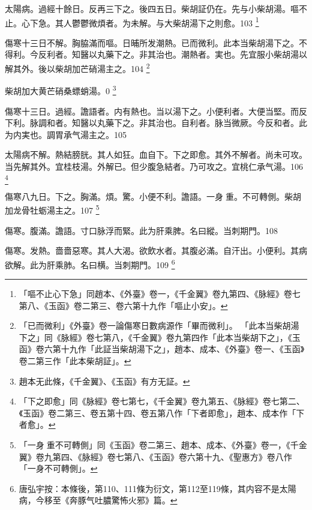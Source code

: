 太陽病。過經十餘日。反再三下之。後四五日。柴胡証仍在。先与小柴胡湯。嘔不止。心下急。其人鬱鬱微煩者。为未解。与大柴胡湯下之則愈。103
	\footnote{
		「嘔不止心下急」同趙本、《外臺》卷一，《千金翼》卷九第四、《脉經》卷七第八、《玉函》卷二第三、卷六第十九作「嘔止小安」。
	}

傷寒十三日不解。胸脇滿而嘔。日晡所发潮熱{\khaaitp 。已}而微利。此本当柴胡湯下之。不得利。今反利者。知醫以丸藥下之。非其治也。潮熱者。実也。先宜服小柴胡湯以解其外。後以柴胡加芒硝湯主之。104
	\footnote{
	「已而微利」《外臺》卷一論傷寒日數病源作「畢而微利」。
	「此本当柴胡湯下之」同《脉經》卷七第八，《千金翼》卷九第四作「此本当柴胡下之」，《玉函》卷六第十九作「此証当柴胡湯下之」，趙本、成本、《外臺》卷一、《玉函》卷二第三作「此本柴胡証」。
	}

柴胡加大黄芒硝桑螵蛸湯。0
	\footnote{
		趙本无此條，《千金翼》、《玉函》有方无証。
	}

傷寒十三日。過經。譫語者。内有熱也。当以湯下之。小便利者。大便当堅。而反{\khaaitp 下}利。脉調和者。知醫以丸藥下之。非其治也。自利者。脉当微厥。今反和者。此为内実也。{\khaaitp 調胃}承气湯主之。105

太陽病不解。熱結膀胱。其人如狂。血自下。下之即愈。其外不解者。尚未可攻。当先解其外。{\khaaitp 宜桂枝湯。}外解已。{\khaaitp 但}少腹急結者。乃可攻之。宜桃仁承气湯。106
	\footnote{
		「下之即愈」同《脉經》卷七第七，《千金翼》卷九第五、《脉經》卷七第二、《玉函》卷二第三、卷五第十四、卷五第八作「下者即愈」，趙本、成本作「下者愈」。
	}

傷寒八九日。下之。胸滿。煩。驚。小便不利。譫語。一身{\khaaitpii 𥁞}{\khaaitp 重。}不可轉側。柴胡加龙骨牡蛎湯主之。107
	\footnote{
		「一身{\sungtpii 𥁞}重不可轉側」同《玉函》卷二第三、趙本、成本、《外臺》卷一，《千金翼》卷九第四、《脉經》卷七第八、《玉函》卷六第十九、《聖惠方》卷八作「一身不可轉側」。
	}

傷寒。腹滿。譫語。寸口脉浮而緊。此为肝乘脾。名曰縱。当刺期門。108

傷寒。发熱。嗇嗇惡寒。其人大渴。欲飲水者。其腹必滿。自汗出。小便利。其病欲解。此为肝乘肺。名曰横。当刺期門。109
	\footnote{
		唐弘宇按：本條後，第110、111條为衍文，第112至119條，其内容不是太陽病，今移至《奔豚气吐膿驚怖火邪》篇。
	}


